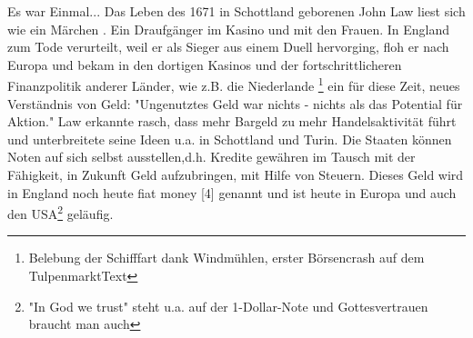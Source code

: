\documentclass[
onecolumn,
a4paper,
abstracton,
parskip=half
,final
]{scrartcl}
\begin{document}
Es war Einmal...
Das Leben des 1671 in Schottland geborenen John Law liest sich wie ein M{\"a}rchen \citep[vgl.][Kap. 2]{strathern2006schumpeters}. Ein Draufg{\"a}nger im Kasino und mit den Frauen. In England zum Tode verurteilt, weil er als Sieger aus einem Duell hervorging, floh er nach Europa und bekam in den dortigen Kasinos und der fortschrittlicheren Finanzpolitik anderer L{\"a}nder, wie z.B. die Niederlande \footnote[2]{Belebung der Schifffart dank Windm{\"u}hlen, erster B{\"o}rsencrash auf dem TulpenmarktText} ein f{\"u}r diese Zeit, neues Verst{\"a}ndnis von Geld: "Ungenutztes Geld war nichts - nichts als das Potential f{\"u}r Aktion." \citep[vgl.][Kap. 2]{strathern2006schumpeters}Law erkannte rasch, dass mehr Bargeld zu mehr Handelsaktivit{\"a}t f{\"u}hrt und unterbreitete seine Ideen u.a. in Schottland und Turin. Die Staaten k{\"o}nnen Noten auf sich selbst ausstellen,d.h. Kredite gew{\"a}hren im Tausch mit der F{\"a}higkeit, in Zukunft Geld aufzubringen, mit Hilfe von Steuern. Dieses Geld wird in England noch heute fiat money [4] genannt und ist heute in Europa und auch den USA\footnote[5]{"In God we trust" steht u.a. auf der 1-Dollar-Note und Gottesvertrauen braucht man auch} gel{\"a}ufig.
\end{document}
